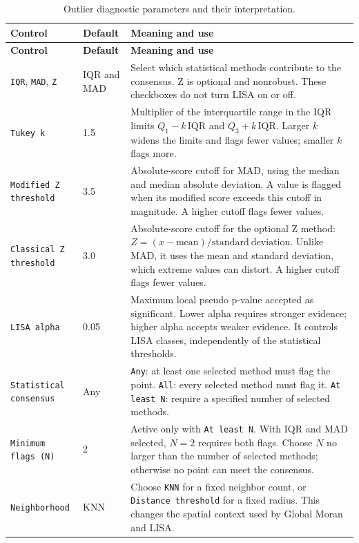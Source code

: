 \documentclass[11pt,a4paper]{article}
\begin{document}
\begin{longtable}{P{0.24\textwidth}P{0.12\textwidth}P{0.55\textwidth}}
\caption{Outlier diagnostic parameters and their interpretation.}\label{tab:outlier-parameters}\\
\toprule
\textbf{Control} & \textbf{Default} & \textbf{Meaning and use} \\
\midrule
\endfirsthead
\toprule
\textbf{Control} & \textbf{Default} & \textbf{Meaning and use} \\
\midrule
\endhead
\texttt{IQR}, \texttt{MAD}, \texttt{Z} & IQR and MAD & Select which statistical methods contribute to the consensus. Z is optional and nonrobust. These checkboxes do not turn LISA on or off. \\
\texttt{Tukey k} & 1.5 & Multiplier of the interquartile range in the IQR limits $Q_1-k\,\mathrm{IQR}$ and $Q_3+k\,\mathrm{IQR}$. Larger $k$ widens the limits and flags fewer values; smaller $k$ flags more. \\
\texttt{Modified Z threshold} & 3.5 & Absolute-score cutoff for MAD, using the median and median absolute deviation. A value is flagged when its modified score exceeds this cutoff in magnitude. A higher cutoff flags fewer values. \\
\texttt{Classical Z threshold} & 3.0 & Absolute-score cutoff for the optional Z method: $Z=(x-\mathrm{mean})/\mathrm{standard\ deviation}$. Unlike MAD, it uses the mean and standard deviation, which extreme values can distort. A higher cutoff flags fewer values. \\
\texttt{LISA alpha} & 0.05 & Maximum local pseudo p-value accepted as significant. Lower alpha requires stronger evidence; higher alpha accepts weaker evidence. It controls LISA classes, independently of the statistical thresholds. \\
\texttt{Statistical consensus} & Any & \texttt{Any}: at least one selected method must flag the point. \texttt{All}: every selected method must flag it. \texttt{At least N}: require a specified number of selected methods. \\
\texttt{Minimum flags (N)} & 2 & Active only with \texttt{At least N}. With IQR and MAD selected, $N=2$ requires both flags. Choose $N$ no larger than the number of selected methods; otherwise no point can meet the consensus. \\
\texttt{Neighborhood} & KNN & Choose \texttt{KNN} for a fixed neighbor count, or \texttt{Distance threshold} for a fixed radius. This changes the spatial context used by Global Moran and LISA. \\

\end{longtable}
\end{document}
